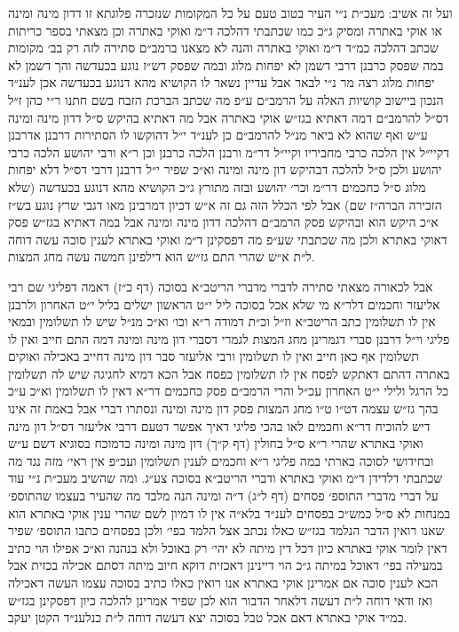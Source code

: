\documentclass[12pt, openany]{book}
\begin{document}
\begin{multicols}{2}
ועל זה אשיב: מעכ״ת נ״י העיר בטוב טעם על כל המקומות שנזכרה פלוגתא זו דדון מינה ומינה או אוקי באתרה ומסיק ג״כ כמו שכתבתי דהלכה ד״מ ואוקי באתרה וכן מצאתי בספר כריתות שכתב דהלכה כמ״ד ד״מ ואוקי באתרה והנה לא מצאנו ברמב״ם סתירה לזה רק בב׳ מקומות במה שפסק כרבנן דרבי דשמן לא יפחות מלוג ובמה שפסק דש״ז נוגע בכעדשה והך דשמן לא יפחות מלוג רצה מר נ״י לבאר אבל עדיין נשאר לו הקושיא מהא דנוגע בכעדשה אכן לענ״ד הנכון ביישוב קושיות האלה על הרמב״ם ע״פ מה שכתב הברכת הזבח בשם חתנו ר״י כהן ז״ל דס״ל להרמב״ם דמה דאתיא בגז״ש אוקי באתרה אבל מה דאתיא בהיקש ס״ל דדון מינה ומינה ע״ש ואף שהוא לא ביאר מנ״ל להרמב״ם כן לענ״ד י״ל דהוקשו לו הסתירות דרבנן אדרבנן דקיי״ל אין הלכה כרבי מחביריו וקיי״ל דר״מ ורבנן הלכה כרבנן וכן ר״א ורבי יהושע הלכה כרבי יהושע ולכן ס״ל להלכה דבהיקש דון מינה ומינה וא״כ שפיר י״ל דרבנן דרבי דס״ל דלא יפחות מלוג ס״ל כחכמים דר״מ וכר׳ יהושע ובזה מתורץ ג״כ הקושיא מהא דנוגע בכעדשה (שלא הזכירה הברה״ז שם) אבל לפי הכלל הזה גם זה א״ש דכיון דמרבינן מאו דגבי שרץ נוגע בש״ז א״כ היקש הוא ובהיקש פסק הרמב״ם דהלכה דדון מינה ומינה אבל במה דאתיא בגז״ש פסק דאוקי באתרא ולכן מה שכתבתי שע״פ מה דפסקינן ד״מ ואוקי באתרא לענין סוכה עשה דוחה ל״ת א״ש שהרי התם גז״ש הוא דילפינן חמשה עשה מחג המצות.\\\vspace{0pt}

אבל לכאורה מצאתי סתירה לדברי מדברי הריטב״א בסוכה (דף כ״ז) דאמה דפליגי שם רבי אליעזר וחכמים דלר״א מי שלא אכל בסוכה ליל י״ט הראשון ישלים בליל י״ט האחרון ולרבנן אין לו תשלומין כתב הריטב״א וז״ל וכ״ת דמודה ר״א וכו׳ וא״כ מנ״ל שיש לו תשלומין ובמאי פליגי וי״ל דרבנן סברי דגמרינן מחג המצות לגמרי דסברי דון מינה ומינה דמה התם חייב ואין לו תשלומין אף כאן חייב ואין לו תשלומין ורבי אליעזר סבר דון מינה דחייב באכילה ואוקים באתרה דהתם דאתקש לפסח אין לו תשלומין כפסח אבל הכא דמיא לחגיגה שיש לה תשלומין כל הרגל ולילי י״ט האחרון עכ״ל והרי הרמב״ם פסק כחכמים דר״א דאין לו תשלומין וא״כ ע״כ בהך גז״ש עצמה דט״ו ט״ו מחג המצות פסק דון מינה ומינה ונסתרו דברי אבל באמת זה אינו דיש להוכיח דר״א וחכמים לאו בהכי פליגי דאיך אפשר דטעם דרבי אליעזר דס״ל דון מינה ואוקי באתרא שהרי ר״א ס״ל בחולין (דף ק״ך) דון מינה ומינה כדמוכח בסוגיא דשם ע״ש ובחידושי לסוכה בארתי במה פליגי ר״א וחכמים לענין תשלומין ועכ״פ אין ראי׳ מזה נגד מה שכתבתי דלדידן ד״מ ואוקי באתרא ודברי הריטב״א בסוכה צע״ג. ומה שהשיב מעכ״ת נ״י עוד על דברי מדברי התוספ׳ פסחים (דף ל״ג) ד״ה ומינה הנה מלבד מה שהעיר בעצמו שהתוספ׳ במנחות לא ס״ל כמש״כ בפסחים לענ״ד בלא״ה אין לו דמיון לשם שהרי ענין אוקי באתרא הוא שאנו רואין הדבר הנלמד בגז״ש כאלו נכתב אצל הלמד בפי׳ ולכן בפסחים כתבו התוספ׳ שפיר דאין לומר אוקי באתרא כיון דכל דין מיתה לא יהי׳ רק באוכל ולא בנהנה וא״כ אפילו הוי כתיב במעילה בפי׳ דאוכל במיתה ג״כ הוי דיינינן דאכזית דוקא חיוב מיתה דסתם אכילה בכזית אבל הכא לענין סוכה אם אמרינן אוקי באתרא אנו רואין כאלו כתיב בסוכה עצמו העשה דאכילה ואז ודאי דוחה ל״ת דעשה דלאחר הדבור הוא לכן שפיר אמרינן להלכה כיון דפסקינן בגז״ש כמ״ד אוקי באתרא דאם אכל טבל בסוכה יצא דעשה דוחה ל״ת כנלענ״ד הקטן יעקב.\\\vspace{0pt}

\end{multicols}\newpage
\end{document}
